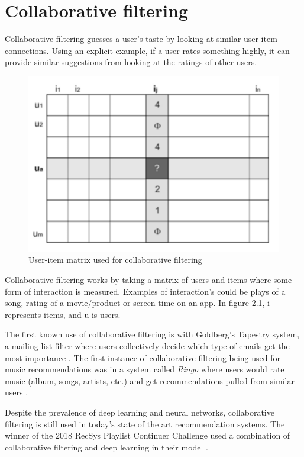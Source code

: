 \section{Collaborative filtering}

Collaborative filtering guesses a user's taste by looking at similar user-item connections. Using an explicit example, if a user rates something highly, it can provide similar suggestions from looking at the ratings of other users\citep{celma_recommendation_2010}.

\begin{figure}[H]
	\includegraphics[scale=0.65]{images/collaborative_filtering}
	\centering
	\caption{User-item matrix used for collaborative filtering \citep{celma_recommendation_2010}} 
	\label{fig:figure}
\end{figure}

Collaborative filtering works by taking a matrix of users and items where some form of interaction is measured. Examples of interaction's could be plays of a song, rating of a movie/product or screen time on an app. In figure 2.1, i represents items, and u is users.

The first known use of collaborative filtering is with Goldberg's Tapestry system, a mailing list filter where users collectively decide which type of emails get the most importance \citep{goldberg_using_1992}. The first instance of collaborative filtering being used for music recommendations was in a system called \textit{Ringo} where users would rate music (album, songs, artists, etc.) and get recommendations pulled from similar users \citep{shardanand_social_1995}. 

Despite the prevalence of deep learning and neural networks, collaborative filtering is still used in today's state of the art recommendation systems. The winner of the 2018  RecSys Playlist Continuer Challenge used a combination of collaborative filtering and deep learning in their model \citep{volkovs_two-stage_2018}.

